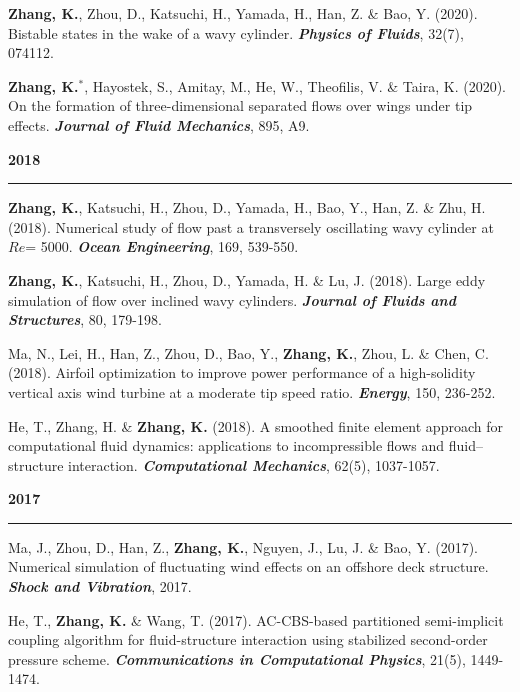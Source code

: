 \documentclass[10pt]{article}
\begin{document}
{\begin{etaremune}
  \item \textbf{Zhang, K.}, Zhou, D., Katsuchi, H., Yamada, H., Han, Z. \& Bao, Y. (2020). Bistable states in the wake of a wavy cylinder. \textit{\textbf{Physics of Fluids}}, 32(7), 074112.
  
  \item \textbf{Zhang, K.}$^*$, Hayostek, S., Amitay, M., He, W., Theofilis, V. \& Taira, K. (2020). On the formation of three-dimensional separated flows over wings under tip effects. \textit{\textbf{Journal of Fluid Mechanics}}, 895, A9.

 \item [] {\bf \color{Blue} 2018 \rule{14.8cm}{0.2mm}} 

  \item \textbf{Zhang, K.}, Katsuchi, H., Zhou, D., Yamada, H., Bao, Y., Han, Z. \& Zhu, H. (2018). Numerical study of flow past a transversely oscillating wavy cylinder at $Re$= 5000. \textit{\textbf{Ocean Engineering}}, 169, 539-550.
  
  \item \textbf{Zhang, K.}, Katsuchi, H., Zhou, D., Yamada, H. \& Lu, J. (2018). Large eddy simulation of flow over inclined wavy cylinders. \textit{\textbf{Journal of Fluids and Structures}}, 80, 179-198.
  
  \item Ma, N., Lei, H., Han, Z., Zhou, D., Bao, Y., \textbf{Zhang, K.}, Zhou, L. \& Chen, C. (2018). Airfoil optimization to improve power performance of a high-solidity vertical axis wind turbine at a moderate tip speed ratio. \textit{\textbf{Energy}}, 150, 236-252.
  
  \item He, T., Zhang, H. \& \textbf{Zhang, K.} (2018). A smoothed finite element approach for computational fluid dynamics: applications to incompressible flows and fluid–structure interaction. \textit{\textbf{Computational Mechanics}}, 62(5), 1037-1057.

 \item [] {\bf \color{Blue} 2017 \rule{14.8cm}{0.2mm}}   

  \item Ma, J., Zhou, D., Han, Z., \textbf{Zhang, K.}, Nguyen, J., Lu, J. \& Bao, Y. (2017). Numerical simulation of fluctuating wind effects on an offshore deck structure. \textit{\textbf{Shock and Vibration}}, 2017.
  \item He, T., \textbf{Zhang, K.} \& Wang, T. (2017). AC-CBS-based partitioned semi-implicit coupling algorithm for fluid-structure interaction using stabilized second-order pressure scheme. \textit{\textbf{Communications in Computational Physics}}, 21(5), 1449-1474.
  

\end{etaremune}}
\end{document}
